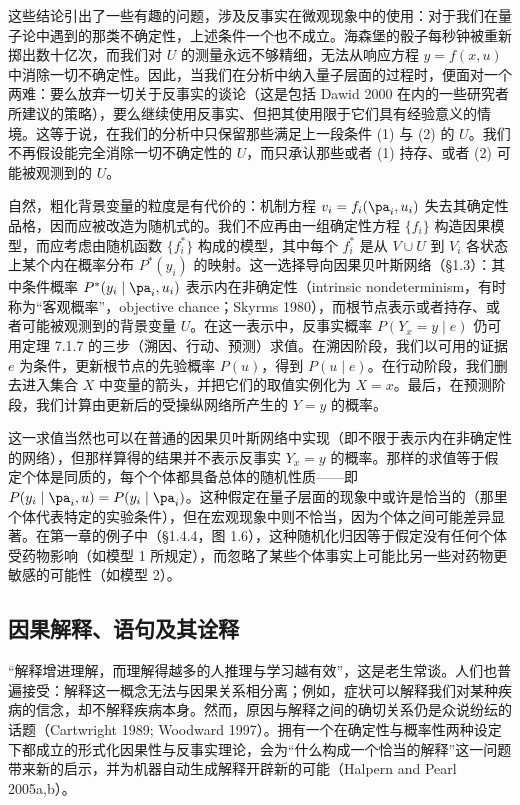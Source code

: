 这些结论引出了一些有趣的问题，涉及反事实在微观现象中的使用：对于我们在量子论中遇到的那类不确定性，上述条件一个也不成立。海森堡的骰子每秒钟被重新掷出数十亿次，而我们对 $U$ 的测量永远不够精细，无法从响应方程 $y=f(x,u)$ 中消除一切不确定性。因此，当我们在分析中纳入量子层面的过程时，便面对一个两难：要么放弃一切关于反事实的谈论（这是包括 Dawid 2000 在内的一些研究者所建议的策略），要么继续使用反事实、但把其使用限于它们具有经验意义的情境。这等于说，在我们的分析中只保留那些满足上一段条件 (1) 与 (2) 的 $U$。我们不再假设能完全消除一切不确定性的 $U$，而只承认那些或者 (1) 持存、或者 (2) 可能被观测到的 $U$。

自然，粗化背景变量的粒度是有代价的：机制方程 $v_i=f_i(\pa_i,u_i)$ 失去其确定性品格，因而应被改造为随机式的。我们不应再由一组确定性方程 $\{f_i\}$ 构造因果模型，而应考虑由随机函数 $\{f_i^*\}$ 构成的模型，其中每个 $f_i^*$ 是从 $V\cup U$ 到 $V_i$ 各状态上某个内在概率分布 $P^*(y_i)$ 的映射。这一选择导向因果贝叶斯网络（\S 1.3）：其中条件概率 $P^*(y_i\mid \pa_i,u_i)$ 表示内在非确定性（intrinsic nondeterminism，有时称为“客观概率”，objective chance；Skyrms 1980），而根节点表示或者持存、或者可能被观测到的背景变量 $U$。在这一表示中，反事实概率 $P(Y_x=y\mid e)$ 仍可用定理 7.1.7 的三步（溯因、行动、预测）求值。在溯因阶段，我们以可用的证据 $e$ 为条件，更新根节点的先验概率 $P(u)$，得到 $P(u\mid e)$。在行动阶段，我们删去进入集合 $X$ 中变量的箭头，并把它们的取值实例化为 $X=x$。最后，在预测阶段，我们计算由更新后的受操纵网络所产生的 $Y=y$ 的概率。

这一求值当然也可以在普通的因果贝叶斯网络中实现（即不限于表示内在非确定性的网络），但那样算得的结果并不表示反事实 $Y_x=y$ 的概率。那样的求值等于假定个体是同质的，每个个体都具备总体的随机性质——即 $P(y_i\mid \pa_i,u)=P(y_i\mid \pa_i)$。这种假定在量子层面的现象中或许是恰当的（那里个体代表特定的实验条件），但在宏观现象中则不恰当，因为个体之间可能差异显著。在第一章的例子中（\S 1.4.4，图 1.6），这种随机化归因等于假定没有任何个体受药物影响（如模型 1 所规定），而忽略了某些个体事实上可能比另一些对药物更敏感的可能性（如模型 2）。

\subsection{因果解释、语句及其诠释}

“解释增进理解，而理解得越多的人推理与学习越有效”，这是老生常谈。人们也普遍接受：解释这一概念无法与因果关系相分离；例如，症状可以解释我们对某种疾病的信念，却不解释疾病本身。然而，原因与解释之间的确切关系仍是众说纷纭的话题（Cartwright 1989; Woodward 1997）。拥有一个在确定性与概率性两种设定下都成立的形式化因果性与反事实理论，会为“什么构成一个恰当的解释”这一问题带来新的启示，并为机器自动生成解释开辟新的可能（Halpern and Pearl 2005a,b）。

